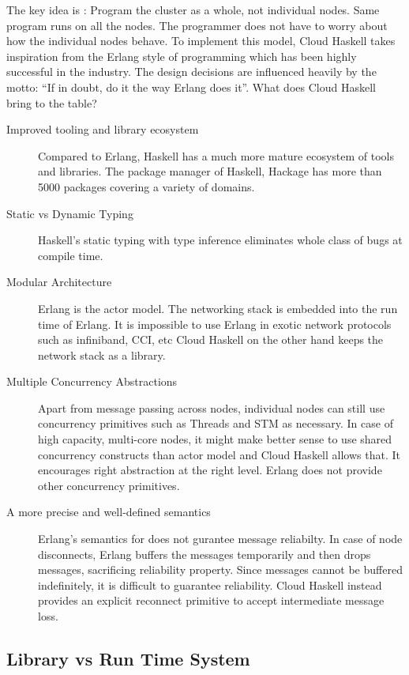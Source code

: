 The key idea is : Program the cluster as a whole, not individual
nodes. Same program runs on all the nodes. The programmer does not
have to worry about how the individual nodes behave. To implement this
model, Cloud Haskell takes inspiration from the Erlang style of
programming which has been highly successful in the industry. The
design decisions are influenced heavily by the motto: ``If in doubt,
do it the way Erlang does it''.  What does Cloud Haskell bring to the
table?
\begin{description}
\item [Improved tooling and library ecosystem] Compared to Erlang,
  Haskell has a much more mature ecosystem of tools and libraries. The
  package manager of Haskell, Hackage has more than 5000 packages
  covering a variety of domains.
\item [Static vs Dynamic Typing] Haskell's static typing with type
  inference eliminates whole class of bugs at compile time.
\item [Modular Architecture] Erlang is the actor model. The networking
  stack is embedded into the run time of Erlang. It is impossible to
  use Erlang in exotic network protocols such as infiniband, CCI, etc
  Cloud Haskell on the other hand keeps the network stack as a library.
\item [Multiple Concurrency Abstractions] Apart from message passing
  across nodes, individual nodes can still use concurrency primitives
  such as Threads and STM as necessary. In case of high capacity,
  multi-core nodes, it might make better sense to use shared
  concurrency constructs than actor model and Cloud Haskell allows
  that. It encourages right abstraction at the right level. Erlang
  does not provide other concurrency primitives.
\item [A more precise and well-defined semantics] Erlang's semantics
  for does not gurantee message reliabilty. In case of node
  disconnects, Erlang buffers the messages temporarily and then drops
  messages, sacrificing reliability property. Since messages cannot be
  buffered indefinitely, it is difficult to guarantee reliability. Cloud
  Haskell instead provides an explicit reconnect primitive to accept
  intermediate message loss.
\end{description}

\subsection{Library vs Run Time System}


